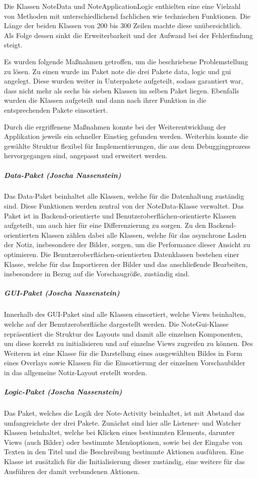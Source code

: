 Die Klassen NoteData und NoteApplicationLogic enthielten eine eine Vielzahl von Methoden mit unterschiedlichend fachlichen wie technischen Funktionen. Die Länge der beiden Klassen von 200 bis 300 Zeilen machte diese unübersichtlich. Als Folge dessen sinkt die Erweiterbarkeit und der Aufwand bei der Fehlerfindung steigt.

Es wurden folgende Maßnahmen getroffen, um die beschriebene Problemstellung zu lösen. Zu einen wurde im Paket note die drei Pakete data, logic und gui angelegt. Diese wurden weiter in Unterpakete aufgeteilt, sodass garantiert war, dass nicht mehr als sechs bis sieben Klassen im selben Paket liegen. Ebenfalls wurden die Klassen aufgeteilt und dann nach ihrer Funktion in die entsprechenden Pakete einsortiert.

Durch die ergriffenene Maßnahmen konnte bei der Weiterentwicklung der Applikation jeweils ein schneller Einstieg gefunden werden. Weiterhin konnte die gewählte Struktur flexibel für Implementierungen, die aus dem Debuggingprozess hervorgegangen sind, angepasst und erweitert werden.

\subparagraph{Data-Paket (Joscha Nassenstein)}
Das Data-Paket beinhaltet alle Klassen, welche für die Datenhaltung zuständig sind. Diese Funktionen werden zentral von der NoteData-Klasse verwaltet. Das Paket ist in Backend-orientierte und Benutzeroberflächen-orientierte Klassen aufgeteilt, um auch hier für eine Differenzierung zu sorgen. Zu den Backend-orientierten Klassen zählen dabei alle Klassen, welche für das asynchrone Laden der Notiz, insbesondere der Bilder, sorgen, um die Performance dieser Ansicht zu optimieren. Die Benutzeroberflächen-orientierten Datenklassen bestehen einer Klasse, welche für das Importieren der Bilder und das anschließende Bearbeiten, insbesondere in Bezug auf die Vorschaugröße, zuständig sind.

\subparagraph{GUI-Paket (Joscha Nassenstein)}
Innerhalb des GUI-Paket sind alle Klassen einsortiert, welche Views beinhalten, welche auf der Benutzeroberfläche dargestellt werden. Die NoteGui-Klasse repräsentiert die Struktur des Layouts und damit alle einzelnen Komponenten, um diese korrekt zu initialisieren und auf einzelne Views zugreifen zu können. Des Weiteren ist eine Klasse für die Darstellung eines ausgewählten Bildes in Form eines Overlays sowie Klassen für die Einsortierung der einzelnen Vorschaubilder in das allgemeine Notiz-Layout erstellt worden.

\subparagraph{Logic-Paket (Joscha Nassenstein)}
Das Paket, welches die Logik der Note-Activity beinhaltet, ist mit Abstand das umfangreichste der drei Pakete. Zunächst sind hier alle Listener- und Watcher Klassen beinhaltet, welche bei Klicken eines bestimmten Elements, darunter Views (auch Bilder) oder bestimmte Menüoptionen, sowie bei der Eingabe von Texten in den Titel und die Beschreibung bestimmte Aktionen ausführen. Eine Klasse ist zusätzlich für die Initialisierung dieser zuständig, eine weitere für das Ausführen der damit verbundenen Aktionen.

